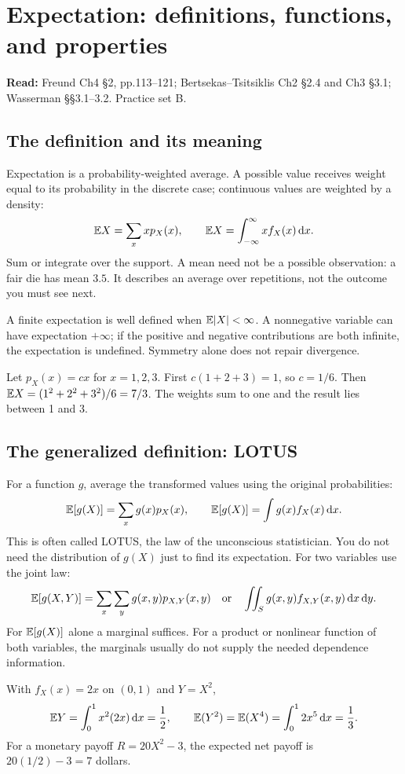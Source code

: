 \section{Expectation: definitions, functions, and properties}
\textbf{Read:} Freund Ch4 \S2, pp.113--121; Bertsekas--Tsitsiklis Ch2 \S2.4 and Ch3 \S3.1; Wasserman \S\S3.1--3.2. Practice set B.
\subsection{The definition and its meaning}
Expectation is a probability-weighted average. A possible value receives weight equal to its probability in the discrete case; continuous values are weighted by a density:
\[
\mathbb E X=\sum_x x p_X(x),\qquad \mathbb E X=\int_{-\infty}^{\infty}x f_X(x)\,\mathrm d x.
\]
Sum or integrate over the support. A mean need not be a possible observation: a fair die has mean $3.5$. It describes an average over repetitions, not the outcome you must see next.

A finite expectation is well defined when $\mathbb E|X|<\infty$. A nonnegative variable can have expectation $+\infty$; if the positive and negative contributions are both infinite, the expectation is undefined. Symmetry alone does not repair divergence.
\begin{example}
Let $p_X(x)=cx$ for $x=1,2,3$. First $c(1+2+3)=1$, so $c=1/6$. Then $\mathbb E X=(1^2+2^2+3^2)/6=7/3$. The weights sum to one and the result lies between 1 and 3.
\end{example}
\subsection{The generalized definition: LOTUS}
For a function $g$, average the transformed values using the original probabilities:
\[
\mathbb E[g(X)]=\sum_xg(x)p_X(x),\qquad \mathbb E[g(X)]=\int g(x)f_X(x)\,\mathrm d x.
\]
This is often called LOTUS, the law of the unconscious statistician. You do not need the distribution of $g(X)$ just to find its expectation. For two variables use the joint law:
\[
\mathbb E[g(X,Y)]=\sum_x\sum_yg(x,y)p_{X,Y}(x,y)
\quad\text{or}\quad \iint_Sg(x,y)f_{X,Y}(x,y)\,\mathrm d x\,\mathrm d y.
\]
For $\mathbb E[g(X)]$ alone a marginal suffices. For a product or nonlinear function of both variables, the marginals usually do not supply the needed dependence information.
\begin{example}
With $f_X(x)=2x$ on $(0,1)$ and $Y=X^2$,
\[
\mathbb E Y=\int_0^1x^2(2x)\,\mathrm d x=\frac12,\qquad \mathbb E(Y^2)=\mathbb E(X^4)=\int_0^12x^5\,\mathrm d x=\frac13.
\]
For a monetary payoff $R=20X^2-3$, the expected net payoff is $20(1/2)-3=7$ dollars.
\end{example}

